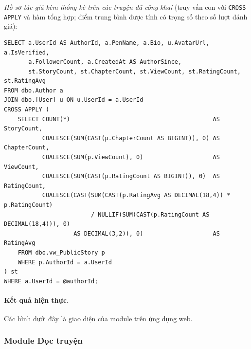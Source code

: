 \textit{Hồ sơ tác giả kèm thống kê trên các truyện đã công khai} (truy vấn con với \texttt{CROSS APPLY} và hàm tổng hợp; điểm trung bình được tính có trọng số theo số lượt đánh giá):
\begin{verbatim}
SELECT a.UserId AS AuthorId, a.PenName, a.Bio, u.AvatarUrl, a.IsVerified,
       a.FollowerCount, a.CreatedAt AS AuthorSince,
       st.StoryCount, st.ChapterCount, st.ViewCount, st.RatingCount, st.RatingAvg
FROM dbo.Author a
JOIN dbo.[User] u ON u.UserId = a.UserId
CROSS APPLY (
    SELECT COUNT(*)                                         AS StoryCount,
           COALESCE(SUM(CAST(p.ChapterCount AS BIGINT)), 0) AS ChapterCount,
           COALESCE(SUM(p.ViewCount), 0)                    AS ViewCount,
           COALESCE(SUM(CAST(p.RatingCount AS BIGINT)), 0)  AS RatingCount,
           COALESCE(CAST(SUM(CAST(p.RatingAvg AS DECIMAL(18,4)) * p.RatingCount)
                         / NULLIF(SUM(CAST(p.RatingCount AS DECIMAL(18,4))), 0)
                    AS DECIMAL(3,2)), 0)                    AS RatingAvg
    FROM dbo.vw_PublicStory p
    WHERE p.AuthorId = a.UserId
) st
WHERE a.UserId = @authorId;
\end{verbatim}

\paragraph{Kết quả hiện thực.} Các hình dưới đây là giao diện của module trên ứng dụng web.


\subsubsection{Module Đọc truyện}
\label{subsubsec:feature-reading}

